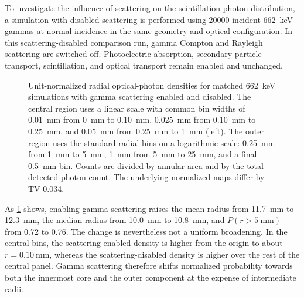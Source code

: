 To investigate the influence of scattering on the scintillation photon distribution, a simulation with disabled scattering is performed using \num{20000} incident \qty{662}{\kilo\electronvolt} gammas at normal incidence in the same  geometry and optical configuration. In this scattering-disabled comparison run, gamma Compton and Rayleigh scattering are switched off. Photoelectric absorption, secondary-particle transport, scintillation, and optical transport remain enabled and unchanged.

\begin{figure}[H]
  \centering
  \caption{Unit-normalized radial optical-photon densities for matched \qty{662}{\kilo\electronvolt}  simulations with gamma scattering enabled and disabled. The central region uses a linear scale with common bin widths of \qty{0.01}{\milli\metre} from \qty{0}{\milli\metre} to \qty{0.10}{\milli\metre}, \qty{0.025}{\milli\metre} from \qty{0.10}{\milli\metre} to \qty{0.25}{\milli\metre}, and \qty{0.05}{\milli\metre} from \qty{0.25}{\milli\metre} to \qty{1}{\milli\metre} (left). The outer region uses the standard radial bins on a logarithmic scale: \qty{0.25}{\milli\metre} from \qty{1}{\milli\metre} to \qty{5}{\milli\metre}, \qty{1}{\milli\metre} from \qty{5}{\milli\metre} to \qty{25}{\milli\metre}, and a final \qty{0.5}{\milli\metre} bin. Counts are divided by annular area and by the total detected-photon count. The underlying normalized  maps differ by TV 0.034.}
  \label{fig:scattering-control}
\end{figure}

As \cref{fig:scattering-control} shows, enabling gamma scattering raises the mean radius from \qty{11.7}{\milli\metre} to \qty{12.3}{\milli\metre}, the median radius from \qty{10.0}{\milli\metre} to \qty{10.8}{\milli\metre}, and $P(r>\qty{5}{\milli\metre})$ from 0.72 to 0.76. The change is nevertheless not a uniform broadening. In the central bins, the scattering-enabled density is higher from the origin to about $r=\qty{0.10}{\milli\metre}$, whereas the scattering-disabled density is higher over the rest of the central panel. Gamma scattering therefore shifts normalized probability towards both the innermost core and the outer component at the expense of intermediate radii.
\FloatBarrier
